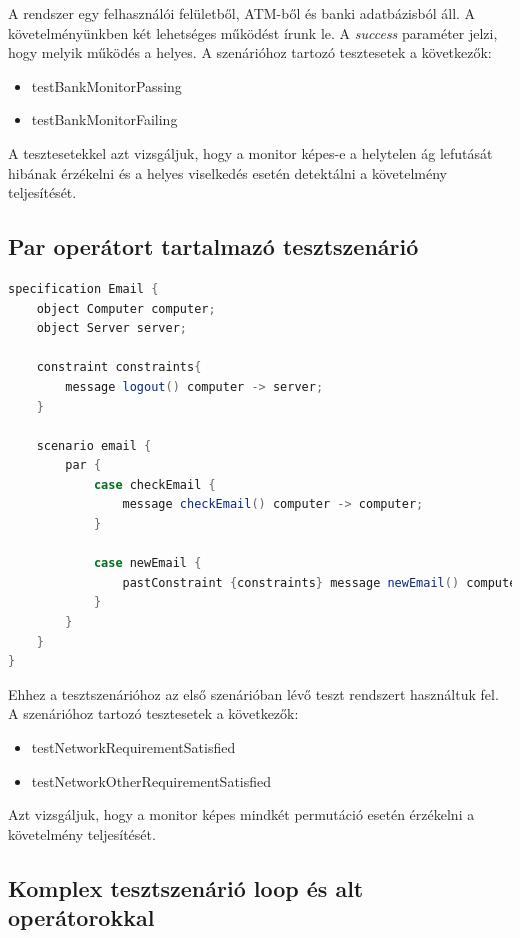 A rendszer egy felhasználói felületből, ATM-ből és banki adatbázisból áll.
A követelményünkben két lehetséges működést írunk le.
A \textit{success} paraméter jelzi, hogy melyik működés a helyes.
A szenárióhoz tartozó tesztesetek a következők:

\begin{itemize}
    \item testBankMonitorPassing
    \item testBankMonitorFailing
\end{itemize}

A tesztesetekkel azt vizsgáljuk, hogy a monitor képes-e a helytelen ág lefutását hibának érzékelni és a helyes viselkedés esetén detektálni a követelmény teljesítését.

\subsection{Par operátort tartalmazó tesztszenárió}

\begin{lstlisting}[language=java, frame=single, float=ht!, caption={Integrációs teszteset.},captionpos=b]
specification Email {
    object Computer computer;
    object Server server;

    constraint constraints{
        message logout() computer -> server;
    }

    scenario email {
        par {
            case checkEmail {
                message checkEmail() computer -> computer;
            }

            case newEmail {
                pastConstraint {constraints} message newEmail() computer -> server;
            }
        }
    }
}
\end{lstlisting}

Ehhez a tesztszenárióhoz az első szenárióban lévő teszt rendszert használtuk fel.
A szenárióhoz tartozó tesztesetek a következők:

\begin{itemize}
    \item testNetworkRequirementSatisfied
    \item testNetworkOtherRequirementSatisfied
\end{itemize}

Azt vizsgáljuk, hogy a monitor képes mindkét permutáció esetén érzékelni a követelmény teljesítését.

\subsection{Komplex tesztszenárió loop és alt operátorokkal}

